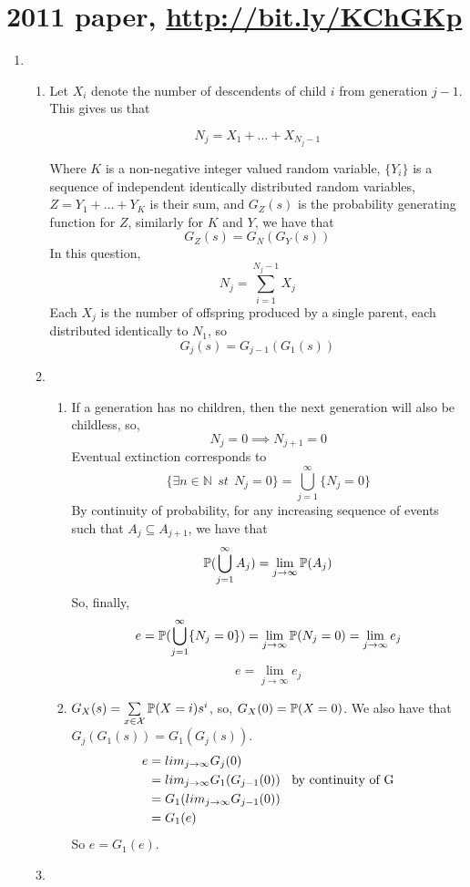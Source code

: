 \documentclass{article}
\begin{document}
\section*{2011 paper, \url{http://bit.ly/KChGKp}}
\begin{enumerate}
\item
\begin{enumerate}
\item
Let $X_i$ denote the number of descendents of child $i$ from generation $j-1$. This gives us that

$$
N_j = X_1 + \dots + X_{N_j-1}
$$

Where $K$ is a non-negative integer valued random variable, $\{Y_i\}$ is a sequence of independent identically distributed random variables, $Z=Y_1+\dots+Y_K$ is their sum, and $G_Z(s)$ is the probability generating function for $Z$, similarly for $K$ and $Y$, we have that
$$
G_Z(s) = G_N(G_Y(s))
$$
In this question, 
$$
N_j=\sum^{N_j-1}_{i=1}X_j
$$
Each $X_j$ is the number of offspring produced by a single parent, each distributed identically to $N_1$, so
$$
G_j(s) = G_{j-1}(G_1(s))
$$
\item
\begin{enumerate}
\item 
If a generation has no children, then the next generation will also be childless, so,
$$
N_j=0 \implies N_{j+1}=0
$$
Eventual extinction corresponds to 
$$
\{\exists n \in \mathbb{N} \;\, st \;\, N_j=0\} = \bigcup^\infty_{j=1}\{N_j=0\}
$$
By continuity of probability, for any increasing sequence of events such that $A_j \subseteq A_{j+1}$, we have that
$$
\mathbb{P}(\bigcup^\infty_{j=1}A_j) = \lim_{j\rightarrow\infty} \mathbb{P}(A_j)
$$
So, finally,
$$
e=\mathbb{P}(\bigcup^\infty_{j=1}\{N_j=0\}) = \lim_{j\rightarrow\infty} \mathbb{P}(N_j=0) = \lim_{j\rightarrow\infty}e_j
$$
$$
e=\lim_{j\rightarrow\infty}e_j
$$
\item
$G_X(s) = \sum\limits_{x \in \mathcal{X}}\mathbb{P}(X=i)s^i$, so, $G_X(0) = \mathbb{P}(X=0)$. We also have that $G_j(G_1(s)) = G_1(G_j(s))$.
\begin{align*}
e &= lim_{j\rightarrow\infty}G_j(0)\\
&= lim_{j\rightarrow\infty}G_1(G_{j-1}(0))\mbox{\;\; by continuity of G}\\
&= G_1(lim_{j\rightarrow\infty}G_{j-1}(0))\\
&= G_1(e)
\end{align*}
So $e = G_1(e)$.
\end{enumerate}
\item
\begin{enumerate}

\end{enumerate}
\end{enumerate}
\end{enumerate}
\end{document}
